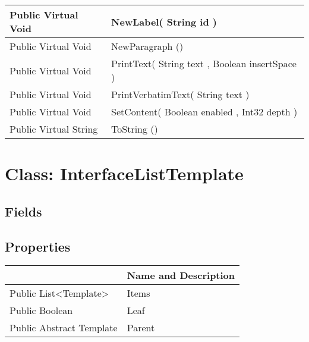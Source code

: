 \documentclass[11pt, oneside, a4paper]{book}
\begin{document}
\begin{center}
\begin{tabular}{| p{3cm} | p{12cm} | }
\hline
 Public  Virtual  Void &  NewLabel(\hypertarget{SoftwareEngineeringTools.{}Documentation.{}HTMLGenerator.{}NewLabel\_String}{} String  id  )\\
\hline
 Public  Virtual  Void &  NewParagraph ()\hypertarget{SoftwareEngineeringTools.{}Documentation.{}HTMLGenerator.{}NewParagraph}{}\\
\hline
 Public  Virtual  Void &  PrintText(\hypertarget{SoftwareEngineeringTools.{}Documentation.{}HTMLGenerator.{}PrintText\_String\_Boolean}{} String  text  ,  Boolean  insertSpace  )\\
\hline
 Public  Virtual  Void &  PrintVerbatimText(\hypertarget{SoftwareEngineeringTools.{}Documentation.{}HTMLGenerator.{}PrintVerbatimText\_String}{} String  text  )\\
\hline
 Public  Virtual  Void &  SetContent(\hypertarget{SoftwareEngineeringTools.{}Documentation.{}HTMLGenerator.{}SetContent\_Boolean\_Int32}{} Boolean  enabled  ,  Int32  depth  )\\
\hline
 Public  Virtual  String &  ToString ()\hypertarget{SoftwareEngineeringTools.{}Documentation.{}HTMLGenerator.{}ToString}{}\\
\hline
\end{tabular}
\end{center}
 


\hypertarget{SoftwareEngineeringTools.{}Documentation.{}InterfaceListTemplate}{}
\section{Class: InterfaceListTemplate}

\subsection{Fields}

\subsection{Properties}
\begin{center}
\begin{tabular}{| p{3cm} | p{12cm} | }
\hline
\textbf{ } & \textbf{ Name and Description}\\
\hline
 Public  List<Template> &  Items\hypertarget{SoftwareEngineeringTools.{}Documentation.{}InterfaceListTemplate.{}Items}{}\\
\hline
 Public  Boolean &  Leaf\hypertarget{SoftwareEngineeringTools.{}Documentation.{}InterfaceListTemplate.{}Leaf}{}\\
\hline
 Public  Abstract  Template &  Parent\hypertarget{SoftwareEngineeringTools.{}Documentation.{}InterfaceListTemplate.{}Parent}{}\\
\hline
\end{tabular}
\end{center}
\end{document}
